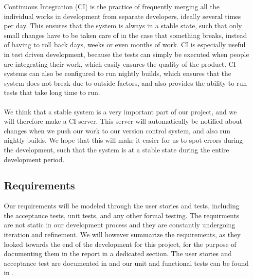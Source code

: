 Continuous Integration (CI) is the practice of frequently merging all the individual works in development from separate developers, ideally several times per day. This ensures that the system is always in a stable state, such that only small changes have to be taken care of in the case that something breaks, instead of having to roll back days, weeks or even months of work. CI is especially useful in test driven development, because the tests can simply be executed when people are integrating their work, which easily ensures the quality of the product. CI systems can also be configured to run nightly builds, which ensures that the system does not break due to outside factors, and also provides the ability to run tests that take long time to run.
\\\\
We think that a stable system is a very important part of our project, and we will therefore make a CI server. This server will automatically be notified about changes when we push our work to our version control system, and also run nightly builds. We hope that this will make it easier for us to spot errors during the development, such that the system is at a stable state during the entire development period. 

\subsection{Requirements}

Our requirements will be modeled through the user stories and tests, including the acceptance tests, unit tests, and any other formal testing. The requirments are not static in our development process and they are constantly undergoing iteration and refinement. We will however summarize the requirements, as they looked towards the end of the development for this project, for the purpose of documenting them in the report in a dedicated section. The user stories and acceptance test are documented in  and our unit and functional tests can be found in .

